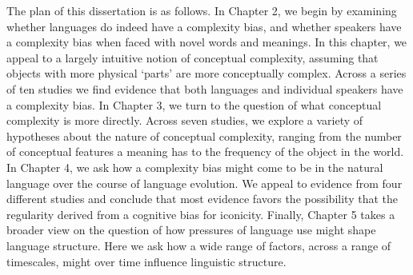 The plan of this dissertation is as follows. In Chapter 2, we begin by examining whether languages do indeed have a complexity bias, and whether speakers have a complexity bias when faced with novel words and meanings. In this chapter, we appeal to a largely intuitive notion of conceptual complexity, assuming that objects with more physical `parts' are more conceptually complex. Across a series of ten studies we find evidence  that both languages and individual speakers have a complexity bias. In Chapter 3, we turn to the question of what conceptual complexity is more directly. Across seven studies, we explore a variety of hypotheses about the nature of conceptual complexity, ranging from the number of conceptual features a meaning has to the frequency of the object in the world. In Chapter 4, we ask how a complexity bias might come to be in the natural language over the course of language evolution. We appeal to evidence from four different studies and conclude that most evidence favors the possibility that the regularity derived from a cognitive bias for iconicity.  Finally, Chapter 5 takes a broader view on the question of how pressures of language use might shape language structure. Here we ask how a wide range of factors, across a range of timescales, might over time influence linguistic structure. 



